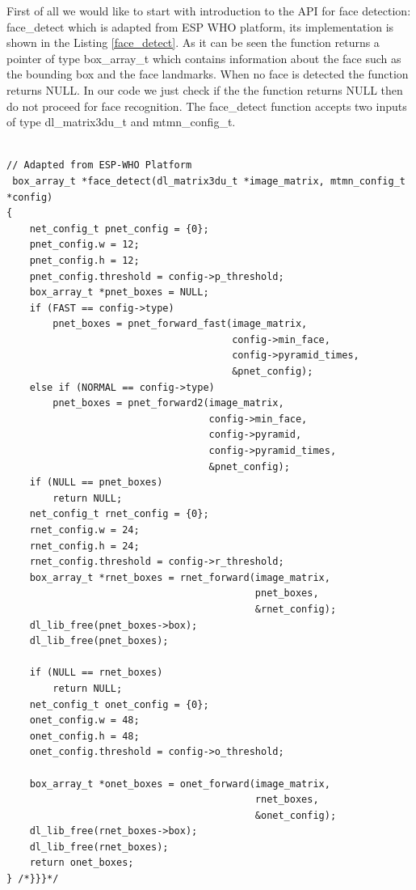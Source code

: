 First of all we would like to start with introduction to the API for face detection: {\selectfont face\_detect} which is adapted from ESP WHO platform, its implementation is shown in the Listing \ref{face_detect}. As it can be seen the function returns a pointer of type {\selectfont box\_array\_t} which contains information about the face such as the bounding box and the face landmarks. When no face is detected the function returns {\selectfont NULL}. In our code we just check if the the function returns {\selectfont NULL} then do not proceed for face recognition. The {\selectfont face\_detect} function accepts two inputs of type {\selectfont dl\_matrix3du\_t} and {\selectfont mtmn\_config\_t}. 


\begin{lstlisting}[caption={Face detection API \cite{espwho}.},label=face_detect, captionpos=b]

// Adapted from ESP-WHO Platform
 box_array_t *face_detect(dl_matrix3du_t *image_matrix, mtmn_config_t *config)
{ 
    net_config_t pnet_config = {0};
    pnet_config.w = 12;
    pnet_config.h = 12;
    pnet_config.threshold = config->p_threshold;
    box_array_t *pnet_boxes = NULL;
    if (FAST == config->type)
        pnet_boxes = pnet_forward_fast(image_matrix,
                                       config->min_face,
                                       config->pyramid_times,
                                       &pnet_config);
    else if (NORMAL == config->type)
        pnet_boxes = pnet_forward2(image_matrix,
                                   config->min_face,
                                   config->pyramid,
                                   config->pyramid_times,
                                   &pnet_config);
    if (NULL == pnet_boxes)
        return NULL;
    net_config_t rnet_config = {0};
    rnet_config.w = 24;
    rnet_config.h = 24;
    rnet_config.threshold = config->r_threshold;
    box_array_t *rnet_boxes = rnet_forward(image_matrix,
                                           pnet_boxes,
                                           &rnet_config);
    dl_lib_free(pnet_boxes->box);
    dl_lib_free(pnet_boxes);

    if (NULL == rnet_boxes)
        return NULL;
    net_config_t onet_config = {0};
    onet_config.w = 48;
    onet_config.h = 48;
    onet_config.threshold = config->o_threshold;

    box_array_t *onet_boxes = onet_forward(image_matrix,
                                           rnet_boxes,
                                           &onet_config);
    dl_lib_free(rnet_boxes->box);
    dl_lib_free(rnet_boxes);
    return onet_boxes;
} /*}}}*/
\end{lstlisting}







